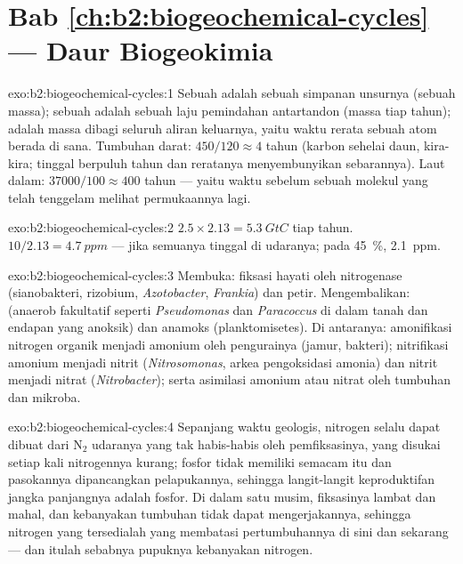 \section*{Bab \ref{ch:b2:biogeochemical-cycles} --- Daur Biogeokimia}

\begin{solution}{exo:b2:biogeochemical-cycles:1}
Sebuah  adalah sebuah simpanan unsurnya (sebuah massa); sebuah
 adalah sebuah laju pemindahan antartandon (massa tiap tahun);
 adalah massa  dibagi seluruh aliran
keluarnya, yaitu waktu rerata sebuah atom berada di sana. Tumbuhan
darat: $450/120 \approx 4$ tahun (karbon sehelai daun, kira-kira; 
tinggal berpuluh tahun dan reratanya menyembunyikan sebarannya). Laut
dalam: $37000/100 \approx 400$ tahun --- yaitu waktu sebelum sebuah
molekul yang telah tenggelam melihat permukaannya lagi.
\end{solution}

\begin{solution}{exo:b2:biogeochemical-cycles:2}
$2.5\times 2.13 = \qty{5.3}{GtC}$ tiap tahun. $10/2.13 = \qty{4.7}{ppm}$
--- jika semuanya tinggal di udaranya; pada 
\qty{45}{\%}, \qty{2.1}{ppm}.
\end{solution}

\begin{solution}{exo:b2:biogeochemical-cycles:3}
Membuka: fiksasi hayati oleh nitrogenase (sianobakteri, rizobium,
\emph{Azotobacter}, \emph{Frankia}) dan petir. Mengembalikan:
 (anaerob fakultatif seperti \emph{Pseudomonas} dan
\emph{Paracoccus} di dalam tanah dan endapan yang anoksik) dan anamoks
(planktomisetes). Di antaranya: amonifikasi nitrogen organik menjadi
amonium oleh pengurainya (jamur, bakteri); nitrifikasi amonium menjadi
nitrit (\emph{Nitrosomonas}, arkea pengoksidasi amonia) dan nitrit
menjadi nitrat (\emph{Nitrobacter}); serta asimilasi amonium atau
nitrat oleh tumbuhan dan mikroba.
\end{solution}

\begin{solution}{exo:b2:biogeochemical-cycles:4}
Sepanjang waktu geologis, nitrogen selalu dapat dibuat dari
$\mathrm{N_2}$ udaranya yang tak habis-habis oleh pemfiksasinya, yang
disukai setiap kali nitrogennya kurang; fosfor tidak memiliki 
semacam itu dan pasokannya dipancangkan pelapukannya, sehingga
langit-langit keproduktifan jangka panjangnya adalah fosfor. Di dalam
satu musim, fiksasinya lambat dan mahal, dan kebanyakan tumbuhan tidak
dapat mengerjakannya, sehingga nitrogen yang tersedialah yang membatasi
pertumbuhannya di sini dan sekarang --- dan itulah sebabnya pupuknya
kebanyakan nitrogen.
\end{solution}

